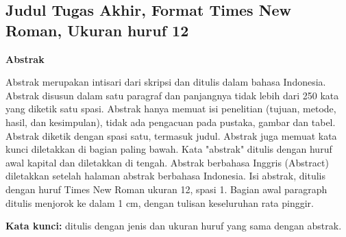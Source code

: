 \begin{singlespace}
\chapter*{\large Judul Tugas Akhir, Format Times New Roman, Ukuran huruf 12}
\begin{center}
    \textbf{Abstrak}
\end{center}
Abstrak merupakan intisari dari skripsi dan ditulis dalam bahasa Indonesia. Abstrak disusun dalam satu paragraf dan panjangnya tidak lebih dari 250 kata yang diketik satu spasi. Abstrak hanya memuat isi penelitian (tujuan, metode, hasil, dan kesimpulan), tidak ada pengacuan pada pustaka, gambar dan tabel. Abstrak diketik dengan spasi satu, termasuk judul. Abstrak juga memuat kata kunci diletakkan di bagian paling bawah. Kata "abstrak" ditulis dengan huruf awal kapital dan diletakkan di tengah. Abstrak berbahasa Inggris (Abstract) diletakkan setelah halaman abstrak berbahasa Indonesia. Isi abstrak, ditulis dengan huruf Times New Roman ukuran 12, spasi 1. Bagian awal paragraph ditulis menjorok ke dalam 1 cm, dengan tulisan keseluruhan rata pinggir.

\vspace{0.5cm}
\noindent \textbf{Kata kunci:} ditulis dengan jenis dan ukuran huruf yang sama dengan abstrak.
\end{singlespace}
